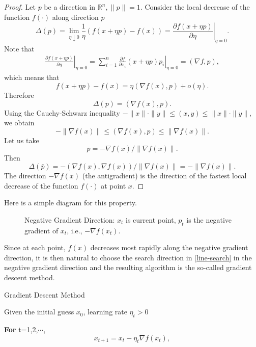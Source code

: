 \begin{proof}
Let $p$ be a direction in $\mathbb{R}^{n},\|p\|=1$. Consider the local decrease of the function $f(\cdot)$ along direction $p$
$$
\Delta(p)=\lim _{\eta \downarrow 0} \frac{1}{\eta}\left(f(x+\eta p)-f(x)\right)=\left. \frac{\partial f(x + \eta p)}{\partial \eta} \right|_{\eta=0}.
$$
Note that 
\begin{equation}
\begin{split}
\left. \frac{\partial f(x + \eta p)}{\partial \eta} \right|_{\eta=0}=\sum_{i=1}^n\left. \frac{\partial f}{\partial x_i}(x + \eta p)p_i \right|_{\eta=0} =(\nabla f, p),
\end{split}
\end{equation}
which means that 
$$
f(x+\eta p)-f(x)=\eta(\nabla f(x), p)+o(\eta) .
$$ 
Therefore
$$
\Delta(p)=(\nabla f(x), p).
$$
Using the Cauchy-Schwarz inequality
$
-\|x\| \cdot\|y\| \leq( x, y) \leq\|x\| \cdot\|y\|,
$
we obtain 
$$
-\|\nabla f(x)\| \le (\nabla f(x), p)\le \|\nabla f(x)\| .
$$ 
Let us take
$$
\bar{p}=-\nabla f(x) /\|\nabla f(x)\|.
$$
Then
$$
\Delta(\bar{p})=-(\nabla f(x), \nabla f(x)) /\|\nabla f(x)\|=-\|\nabla f(x)\|.
$$
The direction $-\nabla f(x)$ (the antigradient) is the direction of the fastest local decrease of the function $f(\cdot)$ at point $x.$ 
\end{proof}

Here is a simple diagram for this property.
	\begin{figure}[H]
		\caption{Negative Gradient Direction: $ x_t$ is current point, $ p_t$ is the negative gradient of $ x_t$, i.e., $- \nabla f( x_t)$.}
		\label{functiongradient}
	\end{figure}

Since at each point,  $f(x)$ decreases most rapidly along the negative
gradient direction, it is then natural to choose the search direction
in \eqref{line-search} in the negative gradient direction and the
resulting algorithm is the so-called gradient descent method.
\begin{algorithm}[H]
\caption{Gradient Descent Method} 
\label{alg:LR-R}
Given the initial guess $x_0$, learning rate $\eta_t>0$

	{\bf For} t=1,2,$\cdots$, \\
	\begin{equation}\label{key}
	x_{t+1} =  x_{t} - \eta_{t} \nabla f({x}_{t}), 
\end{equation}
\end{algorithm}

